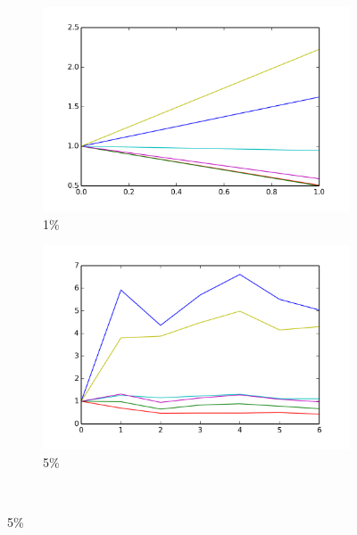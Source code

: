 \documentclass[12pt, a4paper, pdflatex, leqno, twoside]{report}
\begin{document}
\begin{figure}[htbp]
  \begin{subfigure}{.5\linewidth}\centering
    \includegraphics[width=1.1\textwidth]{graphics/convergence_LCB001.png}
    \caption{1\%\label{fig:LCB_conv.ALL:01}}
  \end{subfigure}
  \begin{subfigure}{.5\linewidth}\centering
    \includegraphics[width=1.1\textwidth]{graphics/convergence_LCB005.png}
    \caption{5\%\label{fig:LCB_conv.ALL:05}}
  \end{subfigure}\\[1ex]


\end{figure}
\end{document}
